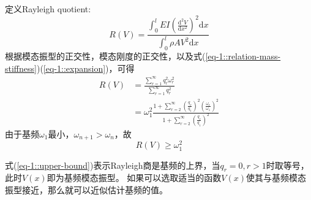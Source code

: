 定义Rayleigh quotient:
\begin{equation}\label{eq-1::Rayleigh-quotient}
    R(V)=\frac{\int_{0}^{l}EI\left(\frac{\mathrm{d}^{2}V}{\mathrm{d}x^{2}}\right)^{2}\mathrm{d}x}
    {\int_{0}^{l}\rho AV^{2}\mathrm{d}x}
\end{equation}
根据模态振型的正交性，模态刚度的正交性，以及式(\ref{eq-1::relation-mass-stiffness})(\ref{eq-1::expansion})，可得
\begin{equation}
    \begin{aligned}
        R(V)&=\frac{\sum_{r=1}^{\infty}q_{r}^{2}\omega_{r}^{2}}{\sum_{r=1}^{\infty}q_{r}^{2}}\\
        &=\omega_{1}^{2}\frac{1 + \sum_{r=2}^{\infty}\left(\frac{q_{r}}{q_{1}}\right)^{2}
        \left(\frac{\omega_{r}}{\omega_{1}}\right)^{2}}{1 + \sum_{r=2}^{\infty}\left(\frac{q_{r}}{q_{1}}\right)^{2}}
    \end{aligned}
\end{equation}
由于基频$\omega_{1}$最小，$\omega_{n+1}>\omega_{n}$，故
\begin{equation}\label{eq-1::upper-bound}
    R(V)\ge \omega_{1}^{2}
\end{equation}

式(\ref{eq-1::upper-bound})表示Rayleigh商是基频的上界，当$q_{r}=0,r>1$时取等号，此时$V(x)$即为基频模态振型。
如果可以选取适当的函数$V(x)$使其与基频模态振型接近，那么就可以近似估计基频的值。
